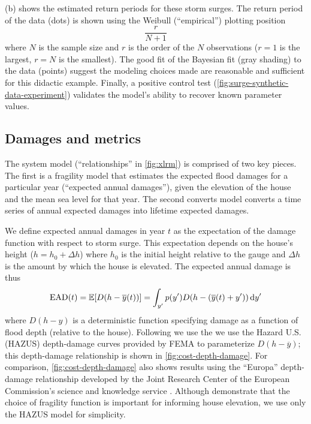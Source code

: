 \documentclass[11pt]{article}
\begin{document}
(b) shows the estimated return periods for these storm surges.
The return period of the data (dots) is shown using the Weibull (``empirical'') plotting position
\begin{equation}\label{eq:plot-pos}
    \frac{r}{N + 1}
\end{equation}
where $N$ is the sample size and $r$ is the order of the $N$ observations ($r=1$ is the largest, $r=N$ is the smallest).
The good fit of the Bayesian fit (gray shading) to the data (points) suggest the modeling choices made are reasonable and sufficient for this didactic example.
Finally, a positive control test (\cref{fig:surge-synthetic-data-experiment}) validates the model's ability to recover known parameter values.

\subsection{Damages and metrics}\label{sec:ead-led}

The system model (``relationships'' in \cref{fig:xlrm}) is comprised of two key pieces.
The first is a fragility model that estimates the expected flood damages for a particular year (``expected annual damages''), given the elevation of the house and the mean sea level for that year.
The second converts model converts a time series of annual expected damages into lifetime expected damages.

We define expected annual damages in year $t$ as the expectation of the damage function with respect to storm surge.
This expectation depends on the house's height ($h = h_0 + \Delta h$) where $h_0$ is the initial height relative to the gauge and $\Delta h$ is the amount by which the house is elevated.
The expected annual damage is thus
\begin{equation}\label{eq:ead}
    \textrm{EAD}(t) = \mathbb{E}[D \qty(h-\overline{y}(t))] = \int_{y'} p(y') D \qty(h - \qty(\overline{y}(t) + y')) \dd{y'}
\end{equation}
where $D(h-y)$ is a deterministic function specifying damage as a function of flood depth (relative to the house).
Following \citet{zarekarizi_suboptimal:2020} we use the we use the Hazard U.S. (HAZUS) depth-damage curves provided by FEMA to parameterize $D(h-\overline{y})$; this depth-damage relationship is shown in \cref{fig:cost-depth-damage}.
For comparison, \cref{fig:cost-depth-damage} also shows results using the ``Europa'' depth-damage relationship developed by the Joint Research Center of the European Commission's science and knowledge service \citep{huizinga_depthdamage:2016}.
Although \citet{zarekarizi_suboptimal:2020} demonstrate that the choice of fragility function is important for informing house elevation, we use only the HAZUS model for simplicity.
\end{document}
